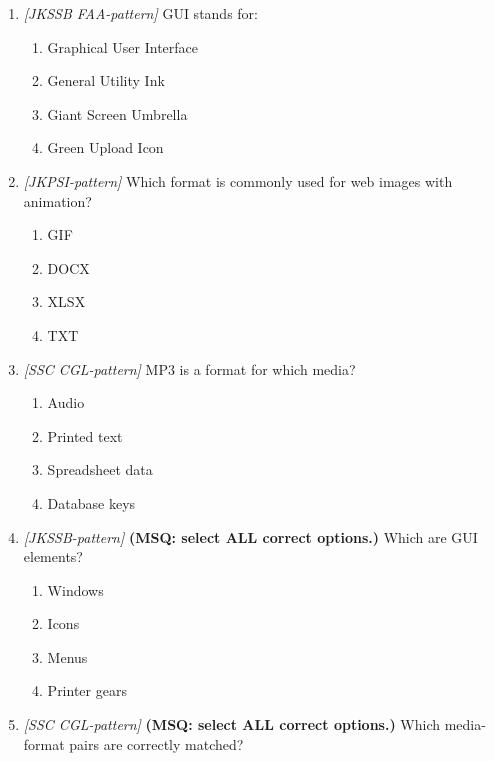 \begin{enumerate}[label=\textbf{Q\arabic*.}, leftmargin=*]
\begin{enumerate}[label=\Roman*.]
    \item PNG is a lossless image format that supports transparency.
  \end{enumerate}
  \begin{enumerate}[label=\Alph*.]
    \item I and II only
    \item I and III only
    \item II and III only
    \item I, II, and III
  \end{enumerate}

\item \textit{[JKSSB FAA-pattern]} GUI stands for:
  \begin{enumerate}[label=\Alph*.]
    \item Graphical User Interface
    \item General Utility Ink
    \item Giant Screen Umbrella
    \item Green Upload Icon
  \end{enumerate}
\item \textit{[JKPSI-pattern]} Which format is commonly used for web images with animation?
  \begin{enumerate}[label=\Alph*.]
    \item GIF
    \item DOCX
    \item XLSX
    \item TXT
  \end{enumerate}
\item \textit{[SSC CGL-pattern]} MP3 is a format for which media?
  \begin{enumerate}[label=\Alph*.]
    \item Audio
    \item Printed text
    \item Spreadsheet data
    \item Database keys
  \end{enumerate}
\item \textit{[JKSSB-pattern]} \textbf{(MSQ: select ALL correct options.)} Which are GUI elements?
  \begin{enumerate}[label=\Alph*.]
    \item Windows
    \item Icons
    \item Menus
    \item Printer gears
  \end{enumerate}
\item \textit{[SSC CGL-pattern]} \textbf{(MSQ: select ALL correct options.)} Which media-format pairs are correctly matched?

\end{enumerate}
